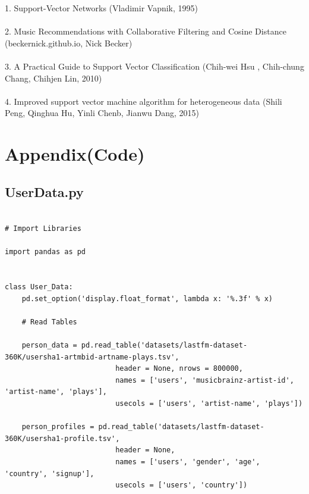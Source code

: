 \documentclass[paper=a4, fontsize=12pt]{scrartcl}
\numberwithin{equation}{section}		%
\numberwithin{figure}{section}			%
\numberwithin{table}{section}				%
\begin{document}
1.	Support-Vector Networks (Vladimir Vapnik, 1995)
\\
\\
2.	Music Recommendations with Collaborative Filtering and Cosine Distance (beckernick.github.io, Nick Becker)
\\
\\
3.	A Practical Guide to Support Vector Classification (Chih-wei Hsu , Chih-chung Chang,  Chihjen Lin, 2010)
\\
\\
4.	Improved support vector machine algorithm for heterogeneous data (Shili Peng, Qinghua Hu, Yinli Chenb, Jianwu Dang, 2015)

\section{Appendix(Code)}


\subsection{UserData.py}
\scriptsize
\begin{lstlisting}

# Import Libraries

import pandas as pd


class User_Data:
	pd.set_option('display.float_format', lambda x: '%.3f' % x)

	# Read Tables

	person_data = pd.read_table('datasets/lastfm-dataset-360K/usersha1-artmbid-artname-plays.tsv',
		                  header = None, nrows = 800000,
		                  names = ['users', 'musicbrainz-artist-id', 'artist-name', 'plays'],
		                  usecols = ['users', 'artist-name', 'plays'])

	person_profiles = pd.read_table('datasets/lastfm-dataset-360K/usersha1-profile.tsv',
		                  header = None,
		                  names = ['users', 'gender', 'age', 'country', 'signup'],
		                  usecols = ['users', 'country'])



\end{lstlisting}
\end{document}
